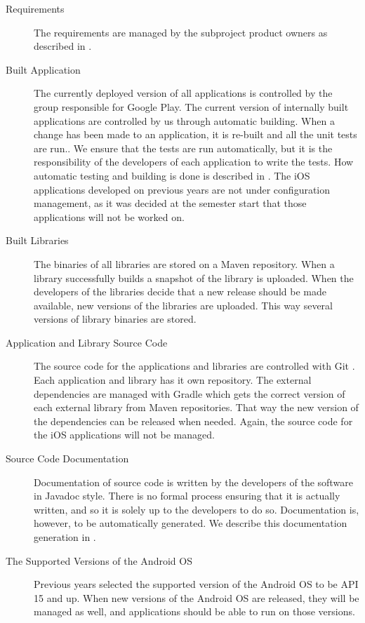 \begin{description}
  \item[Requirements] The requirements are managed by the subproject product owners as described in .
  \item[Built Application] The currently deployed version of all applications is controlled by the group responsible for Google Play. The current version of internally built applications are controlled by us through automatic building. When a change has been made to an application, it is re-built and all the unit tests are run.. We ensure that the tests are run automatically, but it is the responsibility of the developers of each application to write the tests. How automatic testing and building is done is described in  . The iOS applications developed on previous years are not under configuration management, as it was decided at the semester start that those applications will not be worked on.
  \item[Built Libraries] The binaries of all libraries are stored on a Maven repository. When a library successfully builds a snapshot of the library is uploaded. When the developers of the libraries decide that a new release should be made available, new versions of the libraries are uploaded. This way several versions of library binaries are stored.
  \item[Application and Library Source Code] The source code for the applications and libraries are controlled with Git \parencite{gitwebsite}. Each application and library has it own repository. The external dependencies are managed with Gradle which gets the correct version of each external library from Maven repositories. That way the new version of the dependencies can be released when needed. Again, the source code for the iOS applications will not be managed.
  \item[Source Code Documentation] Documentation of source code is written by the developers of the software in Javadoc style. There is no formal process ensuring that it is actually written, and so it is solely up to the developers to do so. Documentation is, however, to be automatically generated. We describe this documentation generation in  .
  \item[The Supported Versions of the Android OS] Previous years selected the supported version of the Android OS to be API 15 and up. When new versions of the Android OS are released, they will be managed as well, and applications should be able to run on those versions.

\end{description}
